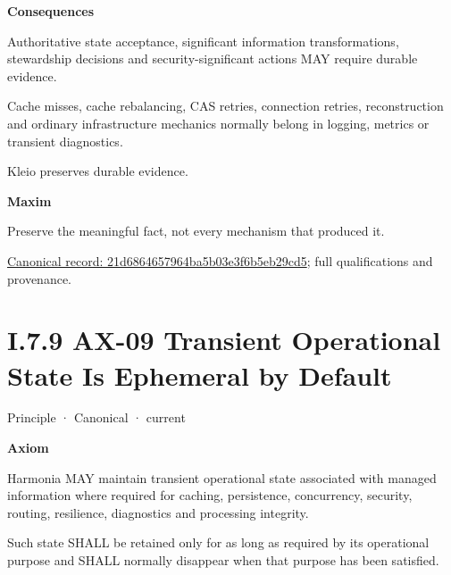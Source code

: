 \par\medskip\textbf{Consequences}\par


Authoritative state acceptance, significant information transformations,
stewardship decisions and security-significant actions MAY require
durable evidence.



Cache misses, cache rebalancing, CAS retries, connection retries,
reconstruction and ordinary infrastructure mechanics normally belong in
logging, metrics or transient diagnostics.



Kleio preserves durable evidence.



\par\medskip\textbf{Maxim}\par


Preserve the meaningful fact, not every mechanism that produced it.


{\footnotesize \href{../../../../../../../continuum/motivation/principle/21d6864657964ba5b03e3f6b5eb29cd5.md}{Canonical record: 21d6864657964ba5b03e3f6b5eb29cd5}; full qualifications and provenance.}\par
\section*{I.7.9 AX-09 Transient Operational State Is Ephemeral by Default}
\label{navigation:I.7.9}

\label{element:9a5cb9e8876844e58e660f909f7df9fc}
{\small Principle · Canonical · current}\par

\par\medskip\textbf{Axiom}\par


Harmonia MAY maintain transient operational state associated with
managed information where required for caching, persistence,
concurrency, security, routing, resilience, diagnostics and processing
integrity.



Such state SHALL be retained only for as long as required by its
operational purpose and SHALL normally disappear when that purpose has
been satisfied.



